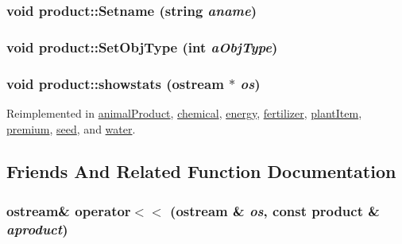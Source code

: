 \hypertarget{classproduct_a0219cde65dc26376f3371a0138199ba8}{
\subsubsection[{Setname}]{\setlength{\rightskip}{0pt plus 5cm}void product::Setname (string {\em aname})}}
\label{classproduct_a0219cde65dc26376f3371a0138199ba8}
\hypertarget{classproduct_a885b4a4a79f193386ef9648b99839978}{
\subsubsection[{SetObjType}]{\setlength{\rightskip}{0pt plus 5cm}void product::SetObjType (int {\em aObjType})}}
\label{classproduct_a885b4a4a79f193386ef9648b99839978}
\hypertarget{classproduct_a1151ea416ab90047f8d087be57a6d7b1}{
\subsubsection[{showstats}]{\setlength{\rightskip}{0pt plus 5cm}void product::showstats (ostream $\ast$ {\em os})}}
\label{classproduct_a1151ea416ab90047f8d087be57a6d7b1}


Reimplemented in \hyperlink{classanimal_product_a22f3158bf013dbbc8519987dee8a34ff}{animalProduct}, \hyperlink{classchemical_abad5f5665261d29f099d3defdac9364d}{chemical}, \hyperlink{classenergy_af421b83f011aca4bc2ee21df490e9326}{energy}, \hyperlink{classfertilizer_a8b3b753b7d29e5a3e22d493e368e5f42}{fertilizer}, \hyperlink{classplant_item_af4591feee9c292842152a6451d392d33}{plantItem}, \hyperlink{classpremium_a69f4bbe9223ea34bddbe6db348670338}{premium}, \hyperlink{classseed_aef923afa921c9ef6b772d0ee573159f4}{seed}, and \hyperlink{classwater_a9f619e4772b1c0cb803e9595d680bcfe}{water}.

\subsection{Friends And Related Function Documentation}
\hypertarget{classproduct_a1b6bf2f2c82a18a17907ee1192fd94bb}{
\subsubsection[{operator$<$$<$}]{\setlength{\rightskip}{0pt plus 5cm}ostream\& operator$<$$<$ (ostream \& {\em os}, \/  const {\bf product} \& {\em aproduct})}}
\label{classproduct_a1b6bf2f2c82a18a17907ee1192fd94bb}


